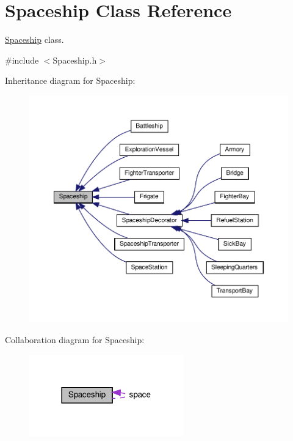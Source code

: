 \hypertarget{classSpaceship}{}\section{Spaceship Class Reference}
\label{classSpaceship}


\hyperlink{classSpaceship}{Spaceship} class.  




{\ttfamily \#include $<$Spaceship.\+h$>$}



Inheritance diagram for Spaceship\+:\nopagebreak
\begin{figure}[H]
\begin{center}
\leavevmode
\includegraphics[width=350pt]{classSpaceship__inherit__graph}
\end{center}
\end{figure}


Collaboration diagram for Spaceship\+:\nopagebreak
\begin{figure}[H]
\begin{center}
\leavevmode
\includegraphics[width=190pt]{classSpaceship__coll__graph}
\end{center}
\end{figure}
